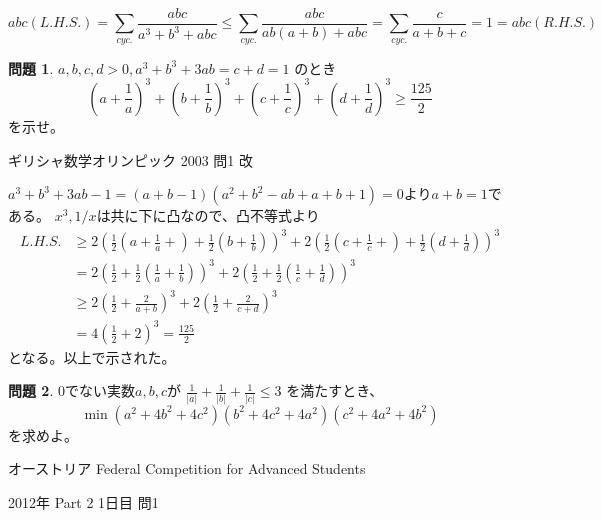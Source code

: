 \documentclass[uplatex, a5paper]{jsarticle}
\makeatletter
\theoremstyle{definition}
\newtheorem{prob}{問題}
\renewenvironment{proof}[1][\proofname]{
  \pushQED{\qed}%
  \normalfont \topsep6\p@\@plus6\p@\relax
  \trivlist
  \item[\hskip\labelsep
    #1\@addpunct{\textbf{.}}]\ignorespaces
}{%
  \popQED\endtrivlist\@endpefalse
}
\providecommand{\proofname}{証明}
\newcommand{\lhs }{ L.H.S. }
\newcommand{\rhs }{ R.H.S. }
\def\qed{\hfill $\Box$}
\makeatother
\begin{document}
\begin{proof}
  \[
  abc(\lhs ) = \sum_{cyc.}\frac{abc}{a^3+b^3+abc}
  \leq \sum_{cyc.}\frac{abc}{ab(a+b)+abc} = \sum_{cyc.}\frac{c}{a+b+c} = 1 = abc(\rhs)
  \]
\end{proof}










\newpage

\begin{prob}
  \(a,b,c,d>0, a^3+b^3+3ab=c+d=1\)
  のとき
  \[
  \left( a+\frac{1}{a} \right) ^3
  + \left( b+\frac{1}{b} \right) ^3
  + \left( c+\frac{1}{c} \right) ^3
  + \left( d+\frac{1}{d} \right) ^3
  \geq \frac{125}{2}
  \]
  を示せ。
  \begin{flushright}
    ギリシャ数学オリンピック 2003 問1 改
  \end{flushright}
\end{prob}


\begin{proof}
  \(a^3+b^3+3ab-1=(a+b-1)(a^2+b^2-ab+a+b+1)=0\)より\(a+b=1\)である。
  \(x^3,1/x\)は共に下に凸なので、凸不等式より
  \begin{align*}
    \lhs &\geq
    2\left( \frac{1}{2}\left( a+\frac{1}{a} +  \right)
    + \frac{1}{2}\left( b + \frac{1}{b} \right) \right) ^3
    + 2\left( \frac{1}{2}\left( c+\frac{1}{c} +  \right) + \frac{1}{2}\left( d + \frac{1}{d} \right) \right) ^3 \\
    &= 2\left( \frac{1}{2} + \frac{1}{2}\left( \frac{1}{a} + \frac{1}{b} \right) \right) ^3
    + 2\left( \frac{1}{2} + \frac{1}{2}\left( \frac{1}{c} + \frac{1}{d } \right) \right) ^3 \\
    &\geq 2\left( \frac{1}{2} + \frac{2}{a+b} \right) ^3 + 2\left( \frac{1}{2} + \frac{2}{c+d} \right) ^3 \\
    &= 4\left( \frac{1}{2} + 2 \right) ^3 = \frac{125}{2}
  \end{align*}
  となる。以上で示された。
\end{proof}










\newpage

\begin{prob}
  \(0\)でない実数\(a,b,c\)が
  \(\displaystyle\frac{1}{|a|} + \frac{1}{|b|} + \frac{1}{|c|} \leq 3\)
  を満たすとき、
  \[
  \min (a^2+4b^2+4c^2)(b^2+4c^2+4a^2)(c^2+4a^2+4b^2)
  \]
  を求めよ。
  \begin{flushright}
    オーストリア Federal Competition for Advanced Students

    2012年 Part 2 1日目 問1
  \end{flushright}
\end{prob}
\end{document}
